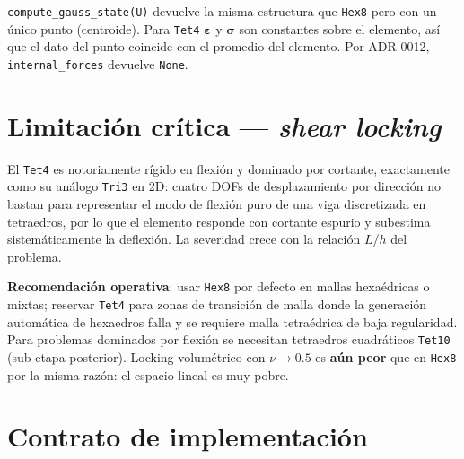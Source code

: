 \documentclass[11pt,letterpaper,oneside]{report}
\begin{document}
\texttt{compute\_gauss\_state(U)} devuelve la misma estructura que \texttt{Hex8} pero con un único punto (centroide). Para \texttt{Tet4} $\boldsymbol\varepsilon$ y $\boldsymbol\sigma$ son constantes sobre el elemento, así que el dato del punto coincide con el promedio del elemento. Por ADR 0012, \texttt{internal\_forces} devuelve \texttt{None}.


\section{Limitación crítica --- \textit{shear locking}}

El \texttt{Tet4} es notoriamente rígido en flexión y dominado por cortante, exactamente como su análogo \texttt{Tri3} en 2D: cuatro DOFs de desplazamiento por dirección no bastan para representar el modo de flexión puro de una viga discretizada en tetraedros, por lo que el elemento responde con cortante espurio y subestima sistemáticamente la deflexión. La severidad crece con la relación $L/h$ del problema.

\textbf{Recomendación operativa}: usar \texttt{Hex8} por defecto en mallas hexaédricas o mixtas; reservar \texttt{Tet4} para zonas de transición de malla donde la generación automática de hexaedros falla y se requiere malla tetraédrica de baja regularidad. Para problemas dominados por flexión se necesitan tetraedros cuadráticos \texttt{Tet10} (sub-etapa posterior). Locking volumétrico con $\nu \to 0.5$ es \textbf{aún peor} que en \texttt{Hex8} por la misma razón: el espacio lineal es muy pobre.


\section{Contrato de implementación}
\end{document}
